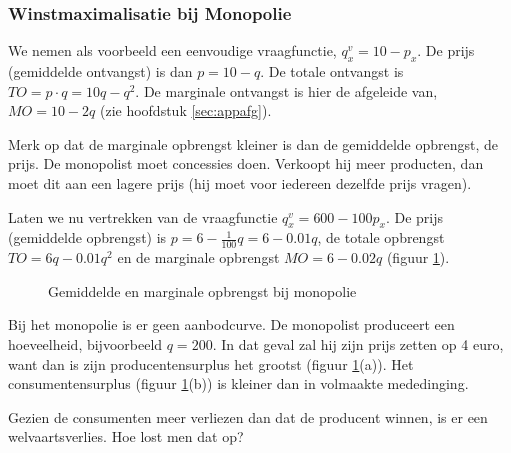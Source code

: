 \subsubsection{Winstmaximalisatie bij Monopolie}

We nemen als voorbeeld een eenvoudige vraagfunctie, $q_x^v=10-p_x$. De prijs (gemiddelde ontvangst) is dan $p=10-q$. De totale ontvangst is $TO=p\cdot q=10q-q^2$. De marginale ontvangst is hier de afgeleide van, $MO=10-2q$ (zie hoofdstuk \ref{sec:appafg}).\par Merk op dat de marginale opbrengst kleiner is dan de gemiddelde opbrengst, de prijs. De monopolist moet concessies doen. Verkoopt hij meer producten, dan moet dit aan een lagere prijs (hij moet voor iedereen dezelfde prijs vragen).\\

\par Laten we nu vertrekken van de vraagfunctie $q_x^v=600-100p_x$. De prijs (gemiddelde opbrengst) is $p=6-\frac{1}{100}q=6-0.01q$, de totale opbrengst $TO=6q-0.01q^2$ en de marginale opbrengst $MO=6-0.02q$ (figuur \ref{fig:h3opmonop}).

\begin{figure}[H]
\vspace{0.5cm}
\centering
\captionsetup{justification=centering,margin=2cm}
\caption{Gemiddelde en marginale opbrengst bij monopolie}
\label{fig:h3opmonop}
\end{figure}

Bij het monopolie is er geen aanbodcurve. De monopolist produceert een hoeveelheid, bijvoorbeeld $q=200$. In dat geval zal hij zijn prijs zetten op 4 euro, want dan is zijn producentensurplus het grootst (figuur \ref{fig:h3opmonop}(a)). Het consumentensurplus (figuur \ref{fig:h3opmonop}(b)) is kleiner dan in volmaakte mededinging.
\par Gezien de consumenten meer verliezen dan dat de producent winnen, is er een welvaartsverlies. Hoe lost men dat op?


